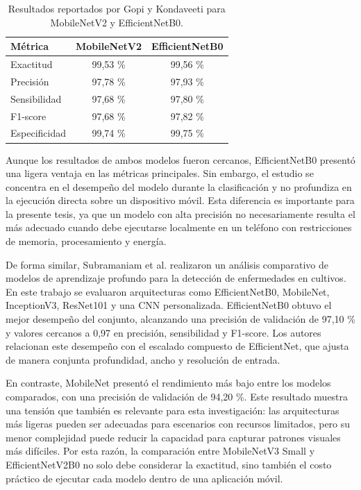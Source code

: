 \begin{table}[H]
    \centering
    \caption{Resultados reportados por Gopi y Kondaveeti para MobileNetV2 y EfficientNetB0.}
    \label{tab:related_gopi_kondaveeti}
    \begin{tabular}{|l|c|c|}
        \hline
        \textbf{Métrica} & \textbf{MobileNetV2} & \textbf{EfficientNetB0} \\
        \hline
        Exactitud & 99,53 \% & 99,56 \% \\
        \hline
        Precisión & 97,78 \% & 97,93 \% \\
        \hline
        Sensibilidad & 97,68 \% & 97,80 \% \\
        \hline
        F1-score & 97,68 \% & 97,82 \% \\
        \hline
        Especificidad & 99,74 \% & 99,75 \% \\
        \hline
    \end{tabular}
\end{table}

Aunque los resultados de ambos modelos fueron cercanos, EfficientNetB0 presentó una ligera ventaja en las métricas principales. Sin
embargo, el estudio se concentra en el desempeño del modelo durante la clasificación y no profundiza en la ejecución directa sobre un
dispositivo móvil. Esta diferencia es importante para la presente tesis, ya que un modelo con alta precisión no necesariamente resulta
el más adecuado cuando debe ejecutarse localmente en un teléfono con restricciones de memoria, procesamiento y energía.

De forma similar, Subramaniam et al. \cite{subramaniam2026comparative} realizaron un análisis comparativo de modelos de aprendizaje
profundo para la detección de enfermedades en cultivos. En este trabajo se evaluaron arquitecturas como EfficientNetB0, MobileNet,
InceptionV3, ResNet101 y una CNN personalizada. EfficientNetB0 obtuvo el mejor desempeño del conjunto, alcanzando una precisión de
validación de 97,10 \% y valores cercanos a 0,97 en precisión, sensibilidad y F1-score. Los autores relacionan este desempeño con el
escalado compuesto de EfficientNet, que ajusta de manera conjunta profundidad, ancho y resolución de entrada.

En contraste, MobileNet presentó el rendimiento más bajo entre los modelos comparados, con una precisión de validación de 94,20 \%.
Este resultado muestra una tensión que también es relevante para esta investigación: las arquitecturas más ligeras pueden ser adecuadas
para escenarios con recursos limitados, pero su menor complejidad puede reducir la capacidad para capturar patrones visuales más
difíciles. Por esta razón, la comparación entre MobileNetV3 Small y EfficientNetV2B0 no solo debe considerar la exactitud, sino también
el costo práctico de ejecutar cada modelo dentro de una aplicación móvil.

